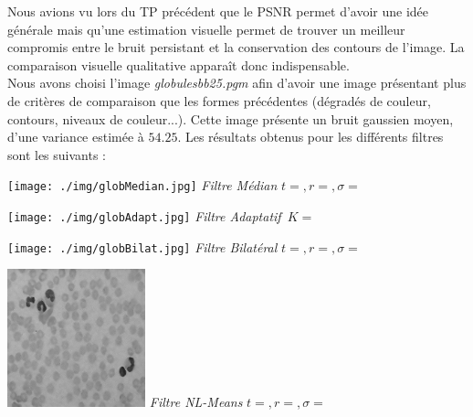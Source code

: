 \documentclass[a4,12pt]{article}
\begin{document}
Nous avions vu lors du TP précédent que le PSNR permet d'avoir une idée générale mais qu'une estimation visuelle permet de trouver un meilleur compromis entre le bruit persistant et la conservation des contours de l'image. La comparaison visuelle qualitative apparaît donc indispensable.\\

Nous avons choisi l'image \textit{globulesbb25.pgm} afin d'avoir une image présentant plus de critères de comparaison que les formes précédentes (dégradés de couleur, contours, niveaux de couleur...). Cette image présente un bruit gaussien moyen, d'une variance estimée à $54.25$. Les résultats obtenus pour les différents filtres sont les suivants :\\

\noindent
\begin{center}
	\begin{minipage}[c]{0.24\linewidth}
		\begin{center}
			\texttt{[image: ./img/globMedian.jpg]}
			\textit{Filtre Médian}
			\textit{$t = , r= , \sigma=$}\
		\end{center}
	\end{minipage}
	\begin{minipage}[c]{0.24\linewidth}
		\begin{center}
			\texttt{[image: ./img/globAdapt.jpg]}
			\textit{Filtre Adaptatif}\
			\textit{$K = $}\
		\end{center}
	\end{minipage}
	\begin{minipage}[c]{0.24\linewidth}
		\begin{center}
			\texttt{[image: ./img/globBilat.jpg]}
			\textit{Filtre Bilatéral}
			\textit{$t = , r= , \sigma=$}\
		\end{center}
	\end{minipage}
	\begin{minipage}[c]{0.24\linewidth}
		\begin{center}
			\includegraphics[width = 40mm]{./img/globNLMeans.jpg}
			\textit{Filtre NL-Means}
			\textit{$t = , r= , \sigma=$}\
		\end{center}
	\end{minipage}\\
\end{center}

\end{document}
